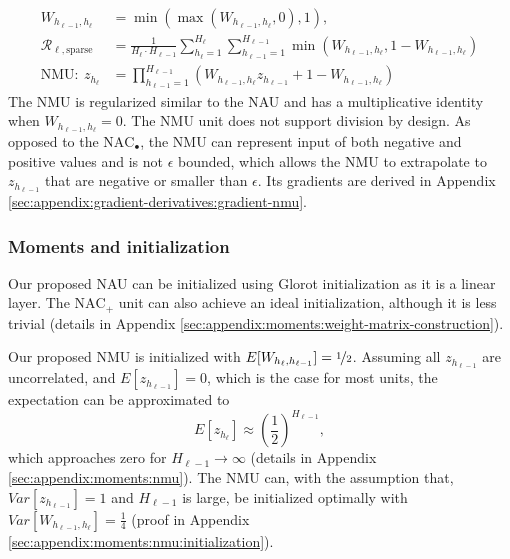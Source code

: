 \begin{align}
W_{h_{\ell-1},h_\ell} &= \min(\max(W_{h_{\ell-1},h_\ell}, 0), 1), \\
\mathcal{R}_{\ell,\mathrm{sparse}} &= \frac{1}{H_\ell \cdot H_{\ell-1}} \sum_{h_\ell=1}^{H_\ell} \sum_{h_{\ell-1}=1}^{H_{\ell-1}} \min\left(W_{h_{\ell-1},h_\ell}, 1 - W_{h_{\ell-1},h_\ell}\right) \\
\textrm{NMU}:\ z_{h_\ell} &= \prod_{h_{\ell-1}=1}^{H_{\ell-1}} \left(W_{h_{\ell-1},h_\ell} z_{h_{\ell-1}} + 1 - W_{h_{\ell-1},h_\ell} \right) \label{eq:nmu-defintion}
\end{align}
The NMU is regularized similar to the NAU and has a multiplicative identity when $W_{h_{\ell-1},h_\ell}=0$.
The NMU unit does not support division by design.
As opposed to the $\mathrm{NAC}_{\bullet}$, the NMU can represent input of both negative and positive values and is not $\epsilon$ bounded, which allows the NMU to extrapolate to $z_{h_{\ell-1}}$ that are negative or smaller than $\epsilon$. Its gradients are derived in Appendix \ref{sec:appendix:gradient-derivatives:gradient-nmu}.

\subsubsection{Moments and initialization}
Our proposed NAU can be initialized using Glorot initialization as it is a linear layer. The $\mathrm{NAC}_{+}$ unit can also achieve an ideal initialization, although it is less trivial (details in Appendix \ref{sec:appendix:moments:weight-matrix-construction}).

Our proposed NMU is initialized with $E[W_{h_{\ell}, h_{\ell - 1}}] = \nicefrac{1}{2}$. Assuming all $z_{h_{\ell-1}}$ are uncorrelated, and $E[z_{h_{\ell-1}}] = 0$, which is the case for most units, the expectation can be approximated to
\begin{equation}
E[z_{h_\ell}] \approx \left(\frac{1}{2}\right)^{H_{\ell-1}},
\end{equation}
which approaches zero for $H_{\ell-1} \rightarrow \infty$ (details in Appendix \ref{sec:appendix:moments:nmu}). The NMU can, with the assumption that, $Var[z_{h_{\ell-1}}] = 1$ and $H_{\ell-1}$ is large, be initialized optimally with $Var[W_{h_{\ell-1},h_\ell}] = \frac{1}{4}$ (proof in Appendix \ref{sec:appendix:moments:nmu:initialization}).

